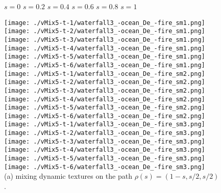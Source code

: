 \begin{figure}[ht!]
{\centering
{\raggedright
 \hspace{0.7cm} $s=0$ \hspace{0.82cm}  $s=0.2$ \hspace{0.82cm} $s=0.4$ \hspace{0.82cm}  $s=0.6$ \hspace{0.82cm}  $s=0.8$ \hspace{0.82cm}  $s=1$\\
}
\vspace{1mm}
    \texttt{[image: ./vMix5-t-1/waterfall3\_-ocean\_De\_-fire\_sm1.png]}
    \texttt{[image: ./vMix5-t-2/waterfall3\_-ocean\_De\_-fire\_sm1.png]}
    \texttt{[image: ./vMix5-t-3/waterfall3\_-ocean\_De\_-fire\_sm1.png]}
    \texttt{[image: ./vMix5-t-4/waterfall3\_-ocean\_De\_-fire\_sm1.png]}
    \texttt{[image: ./vMix5-t-5/waterfall3\_-ocean\_De\_-fire\_sm1.png]}
    \texttt{[image: ./vMix5-t-6/waterfall3\_-ocean\_De\_-fire\_sm1.png]}\\
\vspace{1mm}
    \texttt{[image: ./vMix5-t-1/waterfall3\_-ocean\_De\_-fire\_sm2.png]}
    \texttt{[image: ./vMix5-t-2/waterfall3\_-ocean\_De\_-fire\_sm2.png]}
    \texttt{[image: ./vMix5-t-3/waterfall3\_-ocean\_De\_-fire\_sm2.png]}
    \texttt{[image: ./vMix5-t-4/waterfall3\_-ocean\_De\_-fire\_sm2.png]}
    \texttt{[image: ./vMix5-t-5/waterfall3\_-ocean\_De\_-fire\_sm2.png]}
    \texttt{[image: ./vMix5-t-6/waterfall3\_-ocean\_De\_-fire\_sm2.png]}\\
\vspace{1mm}
    \texttt{[image: ./vMix5-t-1/waterfall3\_-ocean\_De\_-fire\_sm3.png]}
    \texttt{[image: ./vMix5-t-2/waterfall3\_-ocean\_De\_-fire\_sm3.png]}
    \texttt{[image: ./vMix5-t-3/waterfall3\_-ocean\_De\_-fire\_sm3.png]}
    \texttt{[image: ./vMix5-t-4/waterfall3\_-ocean\_De\_-fire\_sm3.png]}
    \texttt{[image: ./vMix5-t-5/waterfall3\_-ocean\_De\_-fire\_sm3.png]}
    \texttt{[image: ./vMix5-t-6/waterfall3\_-ocean\_De\_-fire\_sm3.png]}\\
\vspace{1mm}
(a) mixing dynamic textures on the path $\rho(s) = (1-s, s/2, s/2)$.\\
}
\end{figure}
